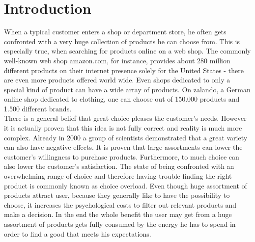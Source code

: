 
\section{Introduction}
\iffalse
{\color{red} 
TODO:
\begin{itemize}
    \item item == document
    \item web-api
    \item doc-comments in source code
    \imte use case
\end{itemize}
}
\fi

\noindent
When a typical customer enters a shop or department store, he often gets confronted with a very huge collection of products he can choose from.
This is especially true, when searching for products online on a web shop.
The commonly well-known web shop \gls{amazon.com}, for instance, provides about 280 million different products on their internet presence solely for the United States - there are even more products offered world wide.\citep{marketplaceanalytics:2014}
Even shops dedicated to only a special kind of product can have a wide array of products.
On \gls{zalando}, a German online shop dedicated to clothing, one can choose out of 150.000 products and 1.500 different brands.\citep{visser:2014}
\\

There is a general belief that great choice pleases the customer's needs.
However it is actually proven that this idea is not fully correct and reality is much more complex.
Already in 2000 a group of scientists demonstrated that a great variety can also have negative effects.
It is proven that large assortments can lower the customer's willingness to purchase products.\citep[p.~312-313]{diehl:2010}
Furthermore, to much choice can also lower the customer's satisfaction.\citep[p.~320]{diehl:2010}
The state of being confronted with an overwhelming range of choice and therefore having trouble finding the right product is commonly known as choice overload.\citep[p.~454]{stanton:2012}
Even though huge assortment of products attract user, because they generally like to have the possibility to choose, it increases the psychological costs to filter out relevant products and make a decision.
In the end the whole benefit the user may get from a huge assortment of products gets fully consumed by the energy he has to spend in order to find a good that meets his expectations.
\citep[p.~64]{bollen:2010}
\\

